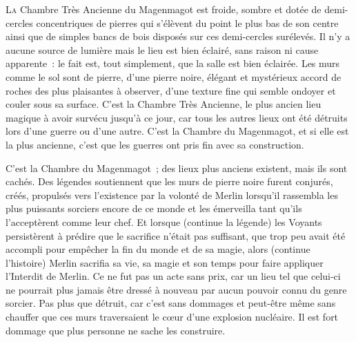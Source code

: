 
\lettrine{L}{a} Chambre Très Ancienne du Magenmagot est froide, sombre et dotée de demi-cercles concentriques de pierres qui s'élèvent du point le plus bas de son centre ainsi que de simples bancs de bois disposés sur ces demi-cercles surélevés. Il n'y a aucune source de lumière mais le lieu est bien éclairé, sans raison ni cause apparente~: le fait est, tout simplement, que la salle est bien éclairée. Les murs comme le sol sont de pierre, d'une pierre noire, élégant et mystérieux accord de roches des plus plaisantes à observer, d'une texture fine qui semble ondoyer et couler sous sa surface. C'est la Chambre Très Ancienne, le plus ancien lieu magique à avoir survécu jusqu'à ce jour, car tous les autres lieux ont été détruits lors d'une guerre ou d'une autre. C'est la Chambre du Magenmagot, et si elle est la plus ancienne, c'est que les guerres ont pris fin avec sa construction.

C'est la Chambre du Magenmagot~; des lieux plus anciens existent, mais ils sont cachés. Des légendes soutiennent que les murs de pierre noire furent conjurés, créés, propulsés vers l'existence par la volonté de Merlin lorsqu'il rassembla les plus puissants sorciers encore de ce monde et les émerveilla tant qu'ils l'acceptèrent comme leur chef. Et lorsque (continue la légende) les Voyants persistèrent à prédire que le sacrifice n'était pas suffisant, que trop peu avait été accompli pour empêcher la fin du monde et de sa magie, alors (continue l'histoire) Merlin sacrifia sa vie, sa magie et son temps pour faire appliquer l'Interdit de Merlin. Ce ne fut pas un acte sans prix, car un lieu tel que celui-ci ne pourrait plus jamais être dressé à nouveau par aucun pouvoir connu du genre sorcier. Pas plus que détruit, car c'est sans dommages et peut-être même sans chauffer que ces murs traversaient le cœur d'une explosion nucléaire. Il est fort dommage que plus personne ne sache les construire.

